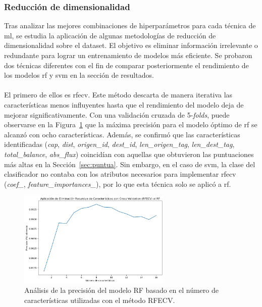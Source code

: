 \subsubsection{Reducción de dimensionalidad}

Tras analizar las mejores combinaciones de hiperparámetros para cada técnica de \gls{ml}, se estudia la aplicación de algunas metodologías de reducción de dimensionalidad sobre el dataset. El objetivo es eliminar información irrelevante o redundante para lograr un entrenamiento de modelos más eficiente. Se probaron dos técnicas diferentes con el fin de comparar posteriormente el rendimiento de los modelos \gls{rf} y \gls{svm} en la sección de resultados. \\
\\
El primero de ellos es \gls{rfecv}. Este método descarta de manera iterativa las características menos influyentes hasta que el rendimiento del modelo deja de mejorar significativamente. Con una validación cruzada de 5-\textit{folds}, puede observarse en la Figura~\ref{fig:fault_sg_12} que la máxima precisión para el modelo óptimo de \gls{rf} se alcanzó con ocho características. Además, se confirmó que las características identificadas (\textit{cap}, \textit{dist}, \textit{origen\_id}, \textit{dest\_id}, \textit{len\_origen\_tag}, \textit{len\_dest\_tag}, \textit{total\_balance}, \textit{abs\_flux}) coincidían con aquellas que obtuvieron las puntuaciones más altas en la Sección~\ref{sec:puntua}. Sin embargo, en el caso de \gls{svm}, la clase del clasificador no contaba con los atributos necesarios para implementar \gls{rfecv} (\textit{coef\_}, \textit{feature\_importances\_}), por lo que esta técnica solo se aplicó a \gls{rf}.  
    
\begin{figure}[H]
\centering
\includegraphics[width=0.65\textwidth]{fig/06_fault_sg/fault_sg_12.png}
\caption{Análisis de la precisión del modelo RF basado en el número de características utilizadas con el método RFECV.}
\label{fig:fault_sg_12}
\end{figure}
    
